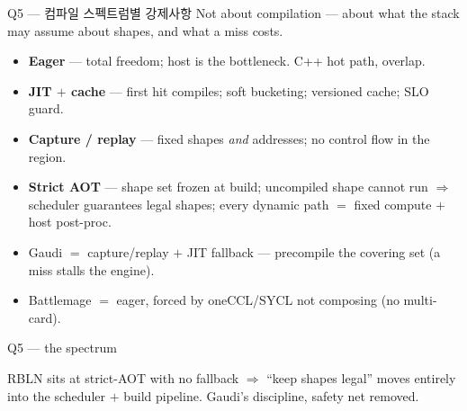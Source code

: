\begin{frame}{Q5 — 컴파일 스펙트럼별 강제사항}
   Not about compilation — about what the stack may assume about shapes, and what a miss costs.
  \begin{itemize}\setlength\itemsep{3pt}
    \item \textbf{Eager} — total freedom; host is the bottleneck. C++ hot path, overlap.
    \item \textbf{JIT $+$ cache} — first hit compiles; soft bucketing; versioned cache; SLO guard.
    \item \textbf{Capture / replay} — fixed shapes \emph{and} addresses; no control flow in the region.
    \item \textbf{Strict AOT} — shape set frozen at build; uncompiled shape cannot run
          $\Rightarrow$ scheduler guarantees legal shapes; every dynamic path $=$ fixed compute $+$ host post-proc.
  \end{itemize}
  \begin{itemize}
    \item Gaudi $=$ capture/replay $+$ JIT fallback — precompile the covering set (a miss stalls the engine).
    \item Battlemage $=$ eager, forced by oneCCL/SYCL not composing (no multi-card).
  \end{itemize}
\end{frame}

\begin{frame}{Q5 — the spectrum}
  \vspace{2em}
  \begin{center}\resizebox{0.98\textwidth}{!}{}\end{center}
  \vspace{1.5em}
  \footnotesize RBLN sits at strict-AOT with no fallback $\Rightarrow$ ``keep shapes legal''
  moves entirely into the scheduler $+$ build pipeline. Gaudi's discipline, safety net removed.
\end{frame}
